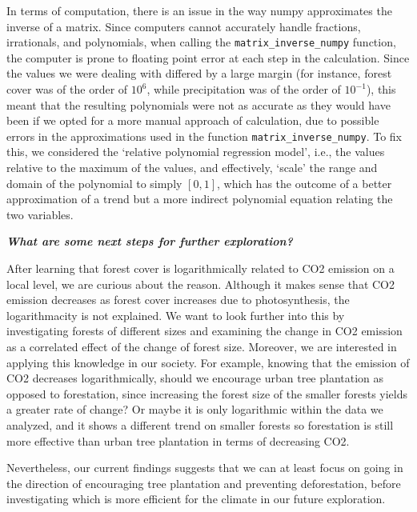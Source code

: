 \documentclass[12pt]{article}
\begin{document}
\begin{enumerate}
\begin{text}
In terms of computation, there is an issue in the way numpy approximates the inverse of a matrix. Since computers cannot accurately handle fractions, irrationals, and polynomials, when calling the \texttt{matrix\_inverse\_numpy} function, the computer is prone to floating point error at each step in the calculation. Since the values we were dealing with differed by a large margin (for instance, forest cover was of the order of $10^6$, while precipitation was of the order of $10^{-1}$), this meant that the resulting polynomials were not as accurate as they would have been if we opted for a more manual approach of calculation, due to possible errors in the approximations used in the function \texttt{matrix\_inverse\_numpy}. To fix this, we considered the `relative polynomial regression model', i.e., the values relative to the maximum of the values, and effectively, `scale' the range and domain of the polynomial to simply $[0, 1]$, which has the outcome of a better approximation of a trend but a more indirect polynomial equation relating the two variables.

\emph{\textbf{What are some next steps for further exploration?}}

After learning that forest cover is logarithmically related to CO2 emission on a local level, we are curious about the reason. Although it makes sense that CO2 emission decreases as forest cover increases due to photosynthesis, the logarithmacity is not explained. We want to look further into this by investigating forests of different sizes and examining the change in CO2 emission as a correlated effect of the change of forest size. Moreover, we are interested in applying this knowledge in our society. For example, knowing that the emission of CO2 decreases logarithmically, should we encourage urban tree plantation as opposed to forestation, since increasing the forest size of the smaller forests yields a greater rate of change? Or maybe it is only logarithmic within the data we analyzed, and it shows a different trend on smaller forests so forestation is still more effective than urban tree plantation in terms of decreasing CO2.

Nevertheless, our current findings suggests that we can at least focus on going in the direction of encouraging tree plantation and preventing deforestation, before investigating which is more efficient for the climate in our future exploration.

\end{text}


\maketitle

\newpage




\end{enumerate}
\end{document}
